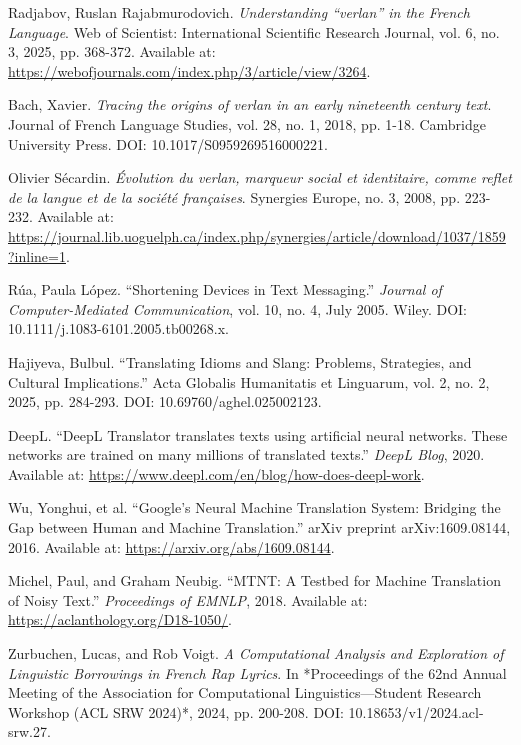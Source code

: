 \documentclass[12pt]{article}
\begin{document}
\cleardoublepage
{}
\begin{thebibliography}{9}

Radjabov, Ruslan Rajabmurodovich. \textit{Understanding ``verlan'' in the French Language}. 
Web of Scientist: International Scientific Research Journal, vol. 6, no. 3, 2025, pp. 368-372. 
Available at: \url{https://webofjournals.com/index.php/3/article/view/3264}.

Bach, Xavier. \textit{Tracing the origins of verlan in an early nineteenth century text}. 
Journal of French Language Studies, vol. 28, no. 1, 2018, pp. 1-18. 
Cambridge University Press. DOI: 10.1017/S0959269516000221.

Olivier Sécardin. \textit{Évolution du verlan, marqueur social et identitaire, comme reflet de la langue et de la société françaises}. 
Synergies Europe, no. 3, 2008, pp. 223-232. 
Available at: \url{https://journal.lib.uoguelph.ca/index.php/synergies/article/download/1037/1859?inline=1}.

Rúa, Paula López. ``Shortening Devices in Text Messaging.'' 
\textit{Journal of Computer-Mediated Communication}, vol. 10, no. 4, July 2005. 
Wiley. DOI: 10.1111/j.1083-6101.2005.tb00268.x.

Hajiyeva, Bulbul. ``Translating Idioms and Slang: Problems, Strategies, and Cultural Implications.''  
Acta Globalis Humanitatis et Linguarum, vol. 2, no. 2, 2025, pp. 284-293. DOI: 10.69760/aghel.025002123.  

DeepL. ``DeepL Translator translates texts using artificial neural networks. These networks are trained on many millions of translated texts.'' 
\textit{DeepL Blog}, 2020. Available at: \url{https://www.deepl.com/en/blog/how-does-deepl-work}.

Wu, Yonghui, et al. ``Google's Neural Machine Translation System: Bridging the Gap between Human and Machine Translation.'' 
arXiv preprint arXiv:1609.08144, 2016. Available at: \url{https://arxiv.org/abs/1609.08144}.

Michel, Paul, and Graham Neubig. ``MTNT: A Testbed for Machine Translation of Noisy Text.''
\textit{Proceedings of EMNLP}, 2018. Available at: \url{https://aclanthology.org/D18-1050/}.

Zurbuchen, Lucas, and Rob Voigt.  
\textit{A Computational Analysis and Exploration of Linguistic Borrowings in French Rap Lyrics}.  
In *Proceedings of the 62nd Annual Meeting of the Association for Computational Linguistics\;---\;Student Research Workshop (ACL SRW 2024)*, 2024, pp. 200-208.  
DOI: 10.18653/v1/2024.acl-srw.27.


\end{thebibliography}
\end{document}
